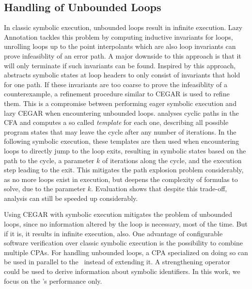 \subsection*{Handling of Unbounded Loops}
In classic symbolic execution, unbounded loops result in infinite execution.
Lazy Annotation \cite{McMillan2010} tackles this problem by computing inductive invariants for loops, unrolling loops up to the point interpolants which are also loop invariants can prove infeasiblity of an error path.
A major downside to this approach is that it will only terminate if such invariants can be found.
Inspired by this approach, \cite{Jaffar2012} abstracts symbolic states at loop headers to only consist of invariants that hold for one path.
If these invariants are too coarse to prove the infeasiblity of a counterexample, a refinement procedure similar to CEGAR is used to refine them.
This is a compromise between performing eager symbolic execution and lazy CEGAR when encountering unbounded loops.
\cite{Slaby2013} analyses cyclic paths in the CFA and computes a so called \emph{template} for each one,
describing all possible program states that may leave the cycle after any number of iterations.
In the following symbolic execution, these templates are then used when encountering loops to directly jump to the loop exits, resulting in symbolic states based on the path to the cycle, a parameter $k$ of iterations along the cycle, and the execution step leading to the exit.
This mitigates the path explosion problem considerably, as no more loops exist in execution, but deepens the complexity of formulas to solve, due to the parameter $k$.
Evaluation shows that despite this trade-off, analysis can still be speeded up considerably.

Using CEGAR with symbolic execution mitigates the problem of unbounded loops, since no information altered by the loop is necessary, most of the time.
But if it is, it results in infinite execution, also.
One advantage of configurable software verification over classic symbolic execution is the possibility to combine multiple CPAs.
For handling unbounded loops, a CPA specialized on doing so can be used in parallel to the \symbolicExecutionCPA\ instead of extending it.
A strengthening operator could be used to derive information about symbolic identifiers.
In this work, we focus on the \symbolicExecutionCPA's performance only.

